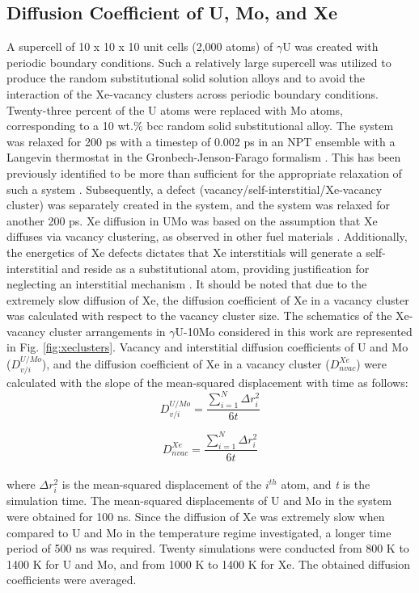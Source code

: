 \documentclass[preprint,12pt]{elsarticle}
\begin{document}
\subsection{Diffusion Coefficient of U, Mo, and Xe}
\label{sec:DC_UMoXe}
\indent A supercell of 10 x 10 x 10 unit cells (2,000 atoms) of $\gamma$U was created with periodic boundary conditions. Such a relatively large supercell was utilized to produce the random substitutional solid solution alloys and to avoid the interaction of the Xe-vacancy clusters across periodic boundary conditions. Twenty-three percent of the U atoms were replaced with Mo atoms, corresponding to a 10 wt.$\%$ bcc random solid substitutional alloy. The system was relaxed for 200 ps with a timestep of 0.002 ps in an NPT ensemble with a Langevin thermostat in the Gronbech-Jenson-Farago formalism \cite{gronbech2013simple, gronbech2014application}. This has been previously identified to be more than sufficient for the appropriate relaxation of such a system \cite{park2021atomistic}. Subsequently, a defect (vacancy/self-interstitial/Xe-vacancy cluster) was separately created in the system, and the system was relaxed for another 200 ps. Xe diffusion in UMo was based on the assumption that Xe diffuses via vacancy clustering, as observed in other fuel materials \cite{perriot2019atomistic, andersson2019density, andersson2011u, thompson2013pathway, bes2015experimental}. Additionally, the energetics of Xe defects dictates that Xe interstitials will generate a self-interstitial and reside as a substitutional atom, providing justification for neglecting an interstitial mechanism \cite{beeler2011formation, beeler2012first}. It should be noted that due to the extremely slow diffusion of Xe, the diffusion coefficient of Xe in a vacancy cluster was calculated with respect to the vacancy cluster size. The schematics of the Xe-vacancy cluster arrangements in $\gamma$U-10Mo considered in this work are represented in Fig. \ref{fig:xeclusters}. Vacancy and interstitial diffusion coefficients of U and Mo ($D_{v/i}^{U/Mo}$), and the diffusion coefficient of Xe in a vacancy cluster ($D_{nvac}^{Xe}$) were calculated with the slope of the mean-squared displacement with time as follows: \\

\begin{equation}
\label{eq:surface1}
D_{v/i}^{U/Mo}=\frac{\sum_{i=1}^{N}{\Delta r_{i}^{2}}}{6t}
\end{equation}

\begin{equation}
\label{eq:surface2}
D_{nvac}^{Xe}=\frac{\sum_{i=1}^{N}{\Delta r_{i}^{2}}}{6t}
\end{equation}
\\
\noindent where $\Delta r_{i}^{2}$ is the mean-squared displacement of the $\textit{i}^{th}$ atom, and \textit{t} is the simulation time. The mean-squared displacements of U and Mo in the system were obtained for 100 ns. Since the diffusion of Xe was extremely slow when compared to U and Mo in the temperature regime investigated, a longer time period of 500 ns was required. Twenty simulations were conducted from 800 K to 1400 K for U and Mo, and from 1000 K to 1400 K for Xe. The obtained diffusion coefficients were averaged. 
\end{document}
